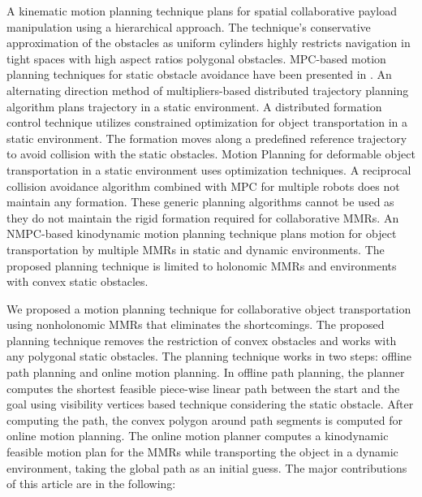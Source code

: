 A kinematic motion planning technique \cite{2019_Tallamraju} plans for spatial collaborative payload manipulation using a hierarchical approach. The technique's conservative approximation of the obstacles as uniform cylinders highly restricts navigation in tight spaces with high aspect ratios polygonal obstacles. MPC-based motion planning techniques for static obstacle avoidance have been presented in \cite{2017_Nikou,2024_Kennel}. An alternating direction method of multipliers-based distributed trajectory planning algorithm \cite{2020_Shorinwa} plans trajectory in a static environment. A distributed formation control technique \cite{2021_Wu} utilizes constrained optimization for object transportation in a static environment. The formation moves along a predefined reference trajectory to avoid collision with the static obstacles. Motion Planning for deformable object transportation \cite{2022_Hu,2024_Pei} in a static environment uses optimization techniques. A reciprocal collision avoidance algorithm \cite{2020_Mao} combined with MPC for multiple robots does not maintain any formation. These generic planning algorithms cannot be used as they do not maintain the rigid formation required for collaborative MMRs. An NMPC-based kinodynamic motion planning technique \cite{2024b_Keshab} plans motion for object transportation by multiple MMRs in static and dynamic environments. The proposed planning technique is limited to holonomic MMRs and environments with convex static obstacles.

We proposed a motion planning technique for collaborative object transportation using nonholonomic MMRs that eliminates the shortcomings. The proposed planning technique removes the restriction of convex obstacles and works with any polygonal static obstacles. The planning technique works in two steps: offline path planning and online motion planning. In offline path planning, the planner computes the shortest feasible piece-wise linear path between the start and the goal using visibility vertices \cite{2005_Choset} based technique considering the static obstacle. After computing the path, the convex polygon around path segments is computed for online motion planning. The online motion planner computes a kinodynamic feasible motion plan for the MMRs while transporting the object in a dynamic environment, taking the global path as an initial guess. The major contributions of this article are in the following:

